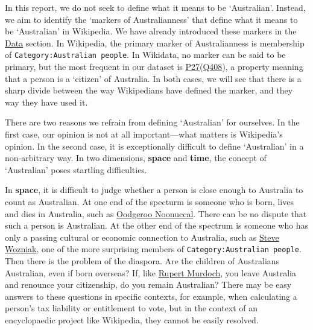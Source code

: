 \documentclass[
  a4paper,
  DIV=11,
  numbers=noendperiod]{scrreprt}
\begin{document}
In this report, we do not seek to define what it means to be
`Australian'. Instead, we aim to identify the `markers of
Australianness' that define what it means to be `Australian' in
Wikipedia. We have already introduced these markers in the
\protect\hyperlink{data}{Data} section. In Wikipedia, the primary marker
of Australianness is membership of \texttt{Category:Australian\ people}.
In Wikidata, no marker can be said to be primary, but the most frequent
in our dataset is
\href{https://www.wikidata.org/wiki/Property:P27}{P27}(\href{https://www.wikidata.org/wiki/Q408}{Q408}),
a property meaning that a person is a `citizen' of Australia. In both
cases, we will see that there is a sharp divide between the way
Wikipedians have defined the marker, and they way they have used it.

There are two reasons we refrain from defining `Australian' for
ourselves. In the first case, our opinion is not at all important---what
matters is Wikipedia's opinion. In the second case, it is exceptionally
difficult to define `Australian' in a non-arbitrary way. In two
dimensions, \textbf{space} and \textbf{time}, the concept of
`Australian' poses startling difficulties.

In \textbf{space}, it is difficult to judge whether a person is close
enough to Australia to count as Australian. At one end of the specturm
is someone who is born, lives and dies in Australia, such as
\href{https://en.wikipedia.org/wiki/Oodgeroo_Noonuccal}{Oodgeroo
Noonuccal}. There can be no dispute that such a person is Australian. At
the other end of the spectrum is someone who has only a passing cultural
or economic connection to Australia, such as
\href{https://en.wikipedia.org/wiki/Steve_Wozniak}{Steve Wozniak}, one
of the more surprising members of \texttt{Category:Australian\ people}.
Then there is the problem of the diaspora. Are the children of
Australians Australian, even if born overseas? If, like
\href{https://en.wikipedia.org/wiki/Rupert_Murdoch}{Rupert Murdoch}, you
leave Australia and renounce your citizenship, do you remain Australian?
There may be easy answers to these questions in specific contexts, for
example, when calculating a person's tax liability or entitlement to
vote, but in the context of an encyclopaedic project like Wikipedia,
they cannot be easily resolved.
\end{document}
